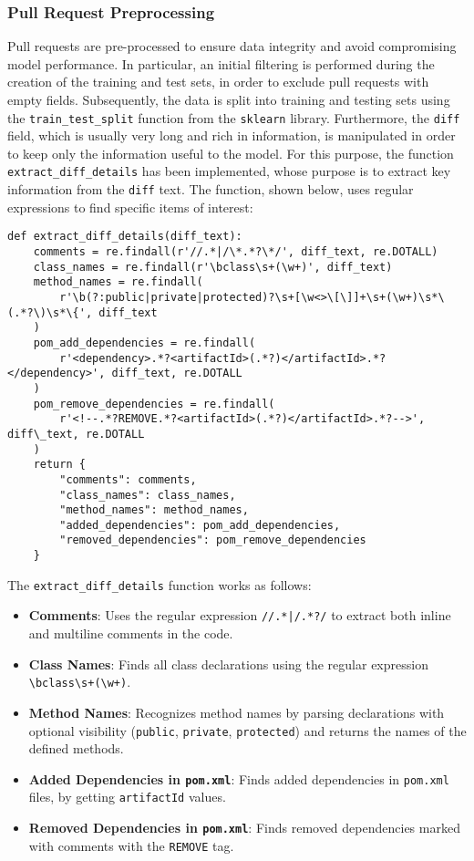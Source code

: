 \subsubsection{Pull Request Preprocessing}
Pull requests are pre-processed to ensure data integrity and avoid compromising model performance. In particular, an initial filtering is performed during the creation of the training and test sets, in order to exclude pull requests with empty fields. Subsequently, the data is split into training and testing sets using the \texttt{train\_test\_split} function from the \texttt{sklearn} library. Furthermore, the \texttt{diff} field, which is usually very long and rich in information, is manipulated in order to keep only the information useful to the model. For this purpose, the function \texttt{extract\_diff\_details} has been implemented, whose purpose is to extract key information from the \texttt{diff} text. The function, shown below, uses regular expressions to find specific items of interest:

\begin{verbatim}
def extract_diff_details(diff_text):
    comments = re.findall(r'//.*|/\*.*?\*/', diff_text, re.DOTALL)
    class_names = re.findall(r'\bclass\s+(\w+)', diff_text)
    method_names = re.findall(
        r'\b(?:public|private|protected)?\s+[\w<>\[\]]+\s+(\w+)\s*\(.*?\)\s*\{', diff_text
    )
    pom_add_dependencies = re.findall(
        r'<dependency>.*?<artifactId>(.*?)</artifactId>.*?</dependency>', diff_text, re.DOTALL
    )
    pom_remove_dependencies = re.findall(
        r'<!--.*?REMOVE.*?<artifactId>(.*?)</artifactId>.*?-->', diff\_text, re.DOTALL
    )
    return {
        "comments": comments,
        "class_names": class_names,
        "method_names": method_names,
        "added_dependencies": pom_add_dependencies,
        "removed_dependencies": pom_remove_dependencies
    }
\end{verbatim}
The \texttt{extract\_diff\_details} function works as follows:
\begin{itemize}
\item \textbf{Comments}: Uses the regular expression \texttt{//.*|/\*.*?\*/} to extract both inline and multiline comments in the code.
\item \textbf{Class Names}: Finds all class declarations using the regular expression \texttt{\textbackslash bclass\textbackslash s+(\textbackslash w+)}.
\item \textbf{Method Names}: Recognizes method names by parsing declarations with optional visibility (\texttt{public}, \texttt{private}, \texttt{protected}) and returns the names of the defined methods.
\item \textbf{Added Dependencies in \texttt{pom.xml}}: Finds added dependencies in \texttt{pom.xml} files, by getting \texttt{artifactId} values.
\item \textbf{Removed Dependencies in \texttt{pom.xml}}: Finds removed dependencies marked with comments with the \texttt{REMOVE} tag.
\end{itemize}

